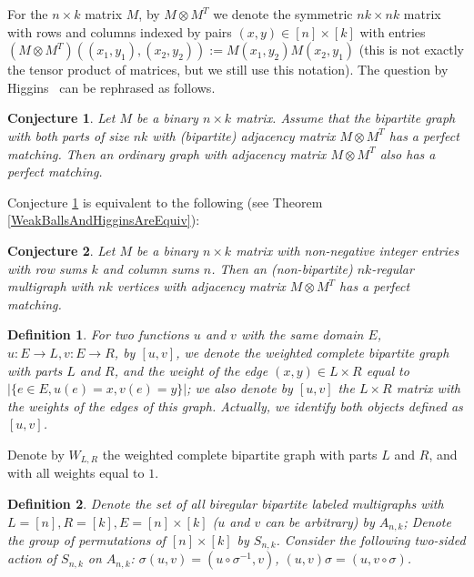 \documentclass[12pt]{article}
\newtheorem{conjecture}{Conjecture}
\theoremstyle{definition}
\theoremstyle{plain}
\newtheorem{definition}{Definition}[section]
\begin{document}
For the $n\times k$ matrix $M$, by $M\otimes M^T$ we denote the symmetric $nk\times nk$ matrix with rows and columns indexed by pairs $(x,y)\in [n] \times [k]$
with entries $(M\otimes M^T)((x_1,y_1),(x_2,y_2)):=M(x_1,y_2)M(x_2,y_1)$ (this is not exactly the tensor
product of matrices, but we still use this notation). The question by Higgins~\cite{H} can be rephrased as follows.

\begin{conjecture}
  \label{HigginsC}
  Let $M$ be a binary $n\times k$ matrix. Assume that the bipartite graph with both parts of size $nk$ with (bipartite) adjacency matrix $M \otimes M^T$ has a perfect matching. Then an ordinary graph with adjacency matrix $M \otimes M^T$ also has a perfect matching.
\end{conjecture}

Conjecture \ref{HigginsC} is equivalent to the following (see Theorem \ref{WeakBallsAndHigginsAreEquiv}):

\begin{conjecture}\label{WeakBallsC}
  Let $M$ be a binary $n\times k$ matrix with non-negative integer entries with row sums $k$ and column sums $n$. Then an (non-bipartite) $nk$-regular multigraph with $nk$ vertices with adjacency matrix $M \otimes M^T$ has a perfect matching.
\end{conjecture}

\begin{definition} \label {SquareBracket}
    For two functions $u$ and $v$ with the same domain $E$, $u : E \rightarrow L, v : E \rightarrow R$, by $[u,v]$, we denote the weighted complete bipartite graph with parts $L$ and $R$, and the weight of the edge $(x,y) \in L \times R$ equal to $| \{ e \in E, u(e) = x, v(e) = y \} |$; we also denote by $[u,v]$ the $L \times R$ matrix with the weights of the edges of this graph. Actually, we identify both objects defined as $[u,v]$.
\end{definition}

Denote by $W_{L,R}$ the weighted complete bipartite graph with parts $L$ and $R$, and with all weights equal to $1$.

\begin{definition} \label {ActionA}
Denote the set of all biregular bipartite labeled multigraphs with $L = [n], R = [k], E=[n] \times [k]$ ($u$ and $v$ can be arbitrary) by $A_{n,k}$;
Denote the group of permutations of $[n] \times [k]$ by $S_{n,k}$.
Consider the following two-sided action of $S_{n,k}$ on $A_{n,k}$: $\sigma (u,v) = (u \circ \sigma^{-1}, v)$, $(u, v) \sigma = (u, v \circ \sigma)$. 
\end{definition}
\end{document}
